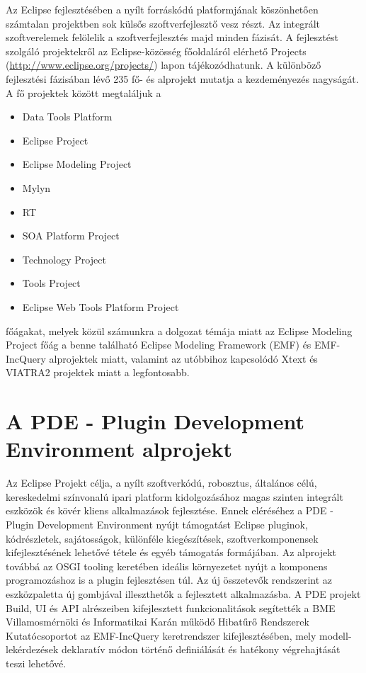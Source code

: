 Az Eclipse fejlesztésében a nyílt forráskódú platformjának köszönhetően számtalan projektben sok külsős szoftverfejlesztő vesz részt. Az integrált szoftverelemek felölelik a szoftverfejlesztés majd minden fázisát. A fejlesztést szolgáló projektekről az Eclipse-közösség főoldaláról elérhető Projects (\url{http://www.eclipse.org/projects/}) lapon tájékozódhatunk. A különböző fejlesztési fázisában lévő 235 fő- és alprojekt mutatja a kezdeményezés nagyságát. A fő projektek között megtaláljuk a
\begin{itemize}
	\item Data Tools Platform
	\item Eclipse Project
	\item Eclipse Modeling Project
	\item Mylyn
	\item RT
	\item SOA Platform Project
	\item Technology Project 
	\item Tools Project
	\item Eclipse Web Tools Platform Project
\end{itemize}
főágakat, melyek közül számunkra a dolgozat témája miatt az Eclipse Modeling Project főág a benne található Eclipse Modeling Framework (EMF) és EMF-IncQuery alprojektek miatt, valamint az utóbbihoz kapcsolódó Xtext és VIATRA2 projektek miatt a legfontosabb.


\section{A PDE - Plugin Development Environment alprojekt}

Az Eclipse Projekt célja, a nyílt szoftverkódú, robosztus, általános célú, kereskedelmi színvonalú ipari platform kidolgozásához magas szinten integrált eszközök és kövér kliens alkalmazások fejlesztése. Ennek eléréséhez a PDE - Plugin Development Environment nyújt támogatást Eclipse pluginok, kódrészletek, sajátosságok, különféle kiegészítések, szoftverkomponensek kifejlesztésének lehetővé tétele és egyéb támogatás formájában. Az alprojekt továbbá az OSGI tooling keretében ideális környezetet nyújt a komponens programozáshoz is a plugin fejlesztésen túl. Az új összetevők rendszerint az eszközpaletta új gombjával illeszthetők a fejlesztett alkalmazásba.
A PDE projekt Build, UI és API alrészeiben kifejlesztett funkcionalitások segítették a BME Villamosmérnöki és Informatikai Karán működő Hibatűrő Rendszerek Kutatócsoportot az EMF-IncQuery keretrendszer kifejlesztésében, mely modell-lekérdezések deklaratív módon történő definiálását és hatékony végrehajtását teszi lehetővé.

